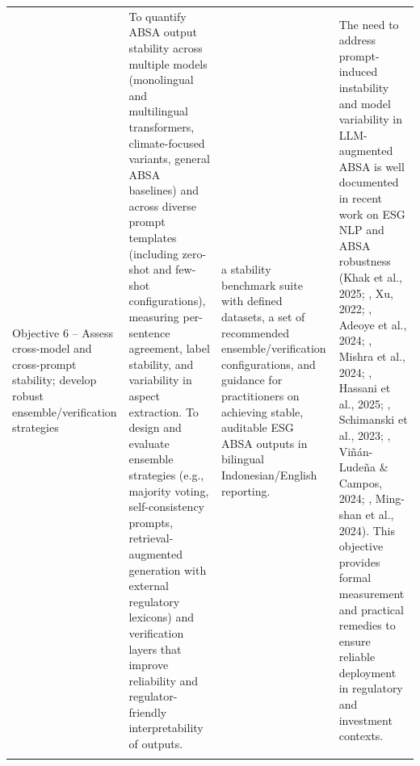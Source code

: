 \begin{landscape}
\begin{longtable}{p{3cm} p{8cm} p{4cm} p{8cm}}
\addlinespace
Objective 6 – Assess cross-model and cross-prompt stability; develop robust ensemble/verification strategies & To quantify ABSA output stability across multiple models (monolingual and multilingual transformers, climate-focused variants, general ABSA baselines) and across diverse prompt templates (including zero-shot and few-shot configurations), measuring per-sentence agreement, label stability, and variability in aspect extraction. To design and evaluate ensemble strategies (e.g., majority voting, self-consistency prompts, retrieval-augmented generation with external regulatory lexicons) and verification layers that improve reliability and regulator-friendly interpretability of outputs. & a stability benchmark suite with defined datasets, a set of recommended ensemble/verification configurations, and guidance for practitioners on achieving stable, auditable ESG ABSA outputs in bilingual Indonesian/English reporting. & The need to address prompt-induced instability and model variability in LLM-augmented ABSA is well documented in recent work on ESG NLP and ABSA robustness (Khak et al., 2025; , Xu, 2022; , Adeoye et al., 2024; , Mishra et al., 2024; , Hassani et al., 2025; , Schimanski et al., 2023; , Viñán-Ludeña \& Campos, 2024; , Ming-shan et al., 2024). This objective provides formal measurement and practical remedies to ensure reliable deployment in regulatory and investment contexts. \\
\addlinespace


\end{longtable}

\end{landscape}